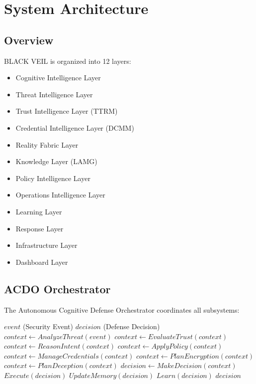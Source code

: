 \documentclass[conference]{IEEEtran}
\begin{document}
\section{System Architecture}
\subsection{Overview}
BLACK VEIL is organized into 12 layers:
\begin{itemize}
    \item Cognitive Intelligence Layer
    \item Threat Intelligence Layer
    \item Trust Intelligence Layer (TTRM)
    \item Credential Intelligence Layer (DCMM)
    \item Reality Fabric Layer
    \item Knowledge Layer (LAMG)
    \item Policy Intelligence Layer
    \item Operations Intelligence Layer
    \item Learning Layer
    \item Response Layer
    \item Infrastructure Layer
    \item Dashboard Layer
\end{itemize}

\subsection{ACDO Orchestrator}
The Autonomous Cognitive Defense Orchestrator coordinates all subsystems:

\begin{algorithm}[h]
\caption{ACDO Event Processing Pipeline}
\begin{algorithmic}[1]
\REQUIRE $event$ (Security Event)
\ENSURE $decision$ (Defense Decision)
\STATE $context \gets AnalyzeThreat(event)$
\STATE $context \gets EvaluateTrust(context)$
\STATE $context \gets ReasonIntent(context)$
\STATE $context \gets ApplyPolicy(context)$
\STATE $context \gets ManageCredentials(context)$
\STATE $context \gets PlanEncryption(context)$
\STATE $context \gets PlanDeception(context)$
\STATE $decision \gets MakeDecision(context)$
\STATE $Execute(decision)$
\STATE $UpdateMemory(decision)$
\STATE $Learn(decision)$
\RETURN $decision$
\end{algorithmic}
\end{algorithm}
\end{document}

